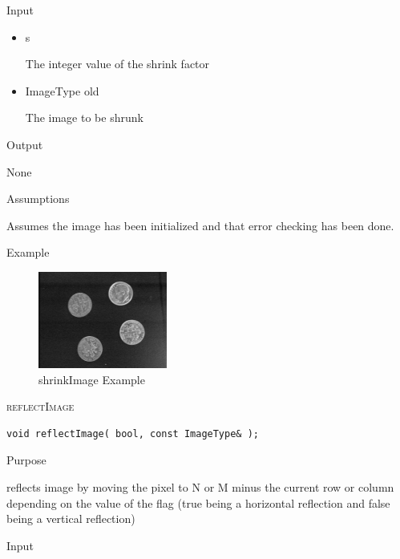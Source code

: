 \documentclass[pdftex, 11pt]{article}
\begin{document}
\begin{description}
\begin{description}
			\item{Input}

				\begin{itemize}

					\item{s}

						The integer value of the shrink factor

					\item{ImageType old}

						The image to be shrunk

				\end{itemize}

			\item{Output}

				None

			\item{Assumptions}

				Assumes the image has been initialized and that error
				checking has been done.

			\item{Example}

				\begin{figure}[p]
					\centering
					\caption{shrinkImage Example}
				\includegraphics{images/outshrink.png}
			\end{figure}

		\end{description}


	\item{\textsc{reflectImage}}
		\begin{description}

\begin{lstlisting}
void reflectImage( bool, const ImageType& );
\end{lstlisting}

			\item{Purpose}

				reflects image by moving the pixel to N or M
				minus the current row or column
				depending on the value of the flag
				(true being a horizontal reflection and
				false being a vertical reflection)

			\item{Input}


\end{description}
\end{description}
\end{document}
